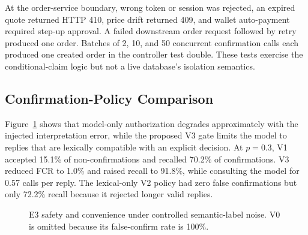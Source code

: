 \documentclass{IEEEtran}
\begin{document}
At the order-service boundary, wrong token or session was rejected, an expired quote returned HTTP 410, price drift returned 409, and wallet auto-payment required step-up approval. A failed downstream order request followed by retry produced one order. Batches of 2, 10, and 50 concurrent confirmation calls each produced one created order in the controller test double. These tests exercise the conditional-claim logic but not a live database's isolation semantics.

\subsection{Confirmation-Policy Comparison}

Figure~\ref{fig:noise} shows that model-only authorization degrades approximately with the injected interpretation error, while the proposed V3 gate limits the model to replies that are lexically compatible with an explicit decision. At $p=0.3$, V1 accepted 15.1\% of non-confirmations and recalled 70.2\% of confirmations. V3 reduced FCR to 1.0\% and raised recall to 91.8\%, while consulting the model for 0.57 calls per reply. The lexical-only V2 policy had zero false confirmations but only 72.2\% recall because it rejected longer valid replies.

\begin{figure}[t]
\centering
{}
\hspace{9mm}%
\caption{E3 safety and convenience under controlled semantic-label noise. V0 is omitted because its false-confirm rate is 100\%.}
\label{fig:noise}
\end{figure}
\end{document}
